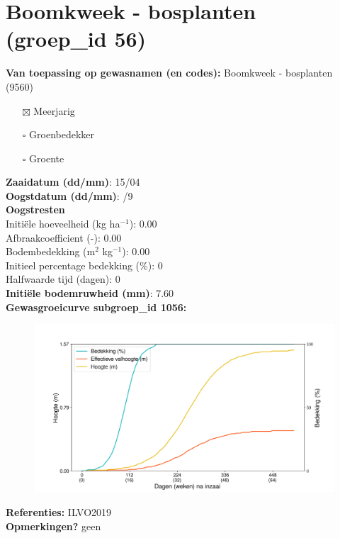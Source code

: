 \documentclass{article}
\begin{document}
 \section{Boomkweek - bosplanten (groep\_id 56)} 
 \textbf{Van toepassing op gewasnamen (en codes):} Boomkweek - bosplanten (9560) 
 \begin{multicols}{3} \begin{itemize} \item[$\boxtimes$] Meerjarig \item[$\square$] Groenbedekker \item[$\square$] Groente \end{itemize} \end{multicols} 
  \textbf{Zaaidatum (dd/mm)}: 15/04  \vspace{0.10cm} \\ 
  \textbf{Oogstdatum (dd/mm)}: /9  \vspace{0.10cm} \\ 
  \textbf{Oogstresten} \vspace{0.05cm} \\ 
  \tab Initi\"{e}le hoeveelheid (kg ha$^{-1}$): 0.00 \vspace{0.05cm} \\ 
  \tab Afbraakcoefficient (-): 0.00 \vspace{0.05cm} \\ 
  \tab Bodembedekking (m$^2$ kg$^{-1}$): 0.00 \vspace{0.05cm} \\ 
  \tab Initieel percentage bedekking (\%): 0 \vspace{0.05cm} \\ 
  \tab Halfwaarde tijd (dagen): 0 \vspace{0.05cm} \\ 
  \textbf{Initi\"{e}le bodemruwheid (mm)}: 7.60 \vspace{0.05cm} \\ 
  \textbf{Gewasgroeicurve subgroep\_id 1056:} 
 \begin{center} \begin{figure}[H] \includegraphics[width=12.5cm]{temp/1056.png} \end{figure} \end{center} 
  \textbf{Referenties:} ILVO2019 \vspace{0.10cm} \\ 
  \textbf{Opmerkingen?} geen \vspace{0.10cm} \\ 
 \newpage 
\end{document}
